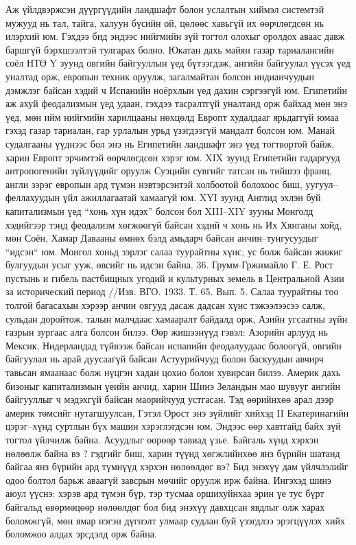 Аж үйлдвэржсэн дүүргүүдийн ландшафт болон услалтын хиймэл системтэй мужууд нь тал, тайга, халуун бүсийн ой, цөлөөс хавьгүй их өөрчлөгдсөн нь илэрхий юм. Гэхдээ бид эндээс нийгмийн зүй тогтол олохыг оролдох аваас давж баршгүй бэрхшээлтэй тулгарах болно. Юкатан дахь майян газар тариалангийн соёл НТӨ Y зуунд овгийн байгууллын үед бүтээгдэж, ангийн байгуулал үүсэх үед уналтад орж, европын техник оруулж, загалмайтан болсон индианчуудын дэмжлэг байсан хэдий ч Испанийн ноёрхлын үед дахин сэргээгүй юм. Египетийн аж ахуй феодализмын үед удаан, гэхдээ тасралтгүй уналтанд орж байхад мөн энэ үед, мөн ийм нийгмийн харилцааны нөхцөлд Европт худалдааг ярьдаггүй юмаа гэхэд газар тариалан, гар урлалын урьд үзэгдээгүй мандалт болсон юм. Манай судалгааны үүднээс бол энэ нь Египетийн ландшафт энэ үед тогтвортой байж, харин Европт эрчимтэй өөрчлөгдсөн хэрэг юм. XIX зуунд Египетийн гадаргууд антропогенийн зүйлүүдийг оруулж Суэцийн сувгийг татсан нь тийшээ франц, англи зэрэг европын ард түмэн нэвтэрсэнтэй холбоотой болохоос биш, уугуул–феллахуудын үйл ажиллагаатай хамаагүй юм.
XYI зуунд Англид эхлэн буй капитализмын үед “хонь хүн идэх” болсон бол XIII–XIY зууны Монголд хэдийгээр тэнд феодализм хөгжөөгүй байсан хэдий ч хонь нь Их Хянганы хойд, мөн Соён, Хамар Давааны өмнөх бэлд амьдарч байсан анчин–тунгусуудыг “идсэн“ юм. Монгол хоньд зэрлэг салаа туурайтны хүнс, ус болж байсан жижиг булгуудын усыг ууж, өвсийг нь идсэн байна. 36. Грумм-Гржимайло Г. Е. Рост пустынь и гибель пастбищных угодий и культурных земель в Центральной Азии за исторический период //Изв. ВГО. 1933. Т. 65. Вып. 5.
Салаа туурайтны тоо толгой багасахын хэрээр анчин овгууд дасаж дадсан хүнс тэжээлээсээ салж, сульдан доройтож, талын малчдаас хамааралт байдалд орж, Азийн угсаатны зүйн газрын зургаас алга болсон билээ. Өөр жишээнүүд гэвэл: Азорийн арлууд нь Мексик, Нидерландад түйвээж байсан испанийн феодалуудаас болоогүй, овгийн байгуулал нь арай дуусаагүй байсан Астуурийчууд болон баскуудын авчирч тавьсан ямаанаас болж нүцгэн хадан цохио болон хувирсан билээ. Америк дахь бизоныг капитализмын үеийн анчид, харин Шинэ Зеландын мао шувууг ангийн байгууллыг ч мэдэхгүй байсан маорийчууд устгасан. Тэд өөрийнхөө арал дээр америк төмсийг нутагшуулсан, Гэтэл Орост энэ зүйлийг хийхэд II Екатеринагийн цэрэг–хүнд суртлын бүх машин хэрэглэгдсэн юм. Эндээс өөр хавтгайд байх зүй тогтол үйлчилж байна.
Асуудлыг өөрөөр тавиад үзье. Байгаль хүнд хэрхэн нөлөөлж байна вэ ? гэдгийг биш, харин түүнд хөгжлийнхөө янз бүрийн шатанд байгаа янз бүрийн ард түмнүүд хэрхэн нөлөөлдөг вэ? Бид энэхүү дам үйлчлэлийг одоо болтол барьж аваагүй завсрын мөчийг оруулж ирж байна. Ингэхэд шинэ аюул үүснэ: хэрэв ард түмэн бүр, тэр тусмаа оршихуйнхаа эрин үе тус бүрт байгальд өвөрмөцөөр нөлөөлдөг бол бид энэхүү давхцсан явдлыг олж харах боломжгүй, мөн ямар нэгэн дүгнэлт улмаар судлан буй үзэгдлээ эрэгцүүлэх хийх боломжоо алдах эрсдэлд орж байна.
